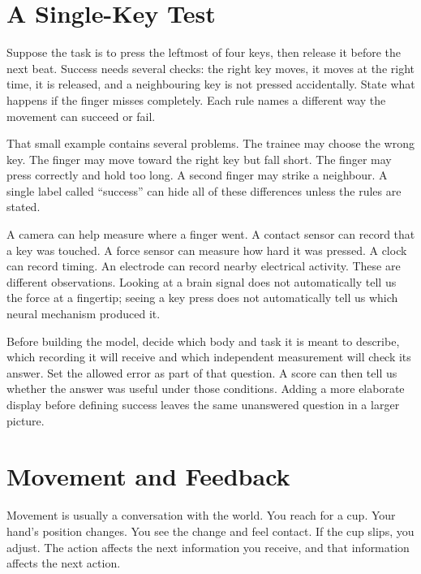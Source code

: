 \section{A Single-Key Test}

Suppose the task is to press the leftmost of four keys, then release it
before the next beat. Success needs several checks: the right key moves, it
moves at the right time, it is released, and a neighbouring key is not pressed
accidentally. State what happens if the finger misses completely. Each rule
names a different way the movement can succeed or fail.\par

That small example contains several problems. The trainee may choose the wrong key. The finger may move toward the right key but fall short. The finger may press correctly and hold too long. A second finger may strike a neighbour. A single label called ``success'' can hide all of these differences unless the rules are stated.\par

A camera can help measure where a finger went. A contact sensor can record that a key was touched. A force sensor can measure how hard it was pressed. A clock can record timing. An electrode can record nearby electrical activity. These are different observations. Looking at a brain signal does not automatically tell us the force at a fingertip; seeing a key press does not automatically tell us which neural mechanism produced it.\par

Before building the model, decide which body and task it is meant to describe, which recording it will receive and which independent measurement will check its answer. Set the allowed error as part of that question. A score can then tell us whether the answer was useful under those conditions. Adding a more elaborate display before defining success leaves the same unanswered question in a larger picture.\par

\section{Movement and Feedback}

Movement is usually a conversation with the world. You reach for a cup. Your hand's position changes. You see the change and feel contact. If the cup slips, you adjust. The action affects the next information you receive, and that information affects the next action.\par

